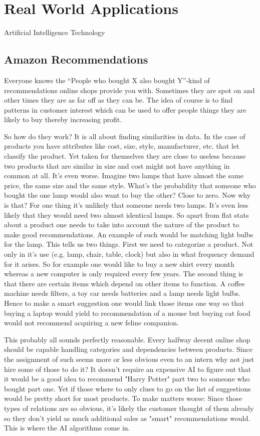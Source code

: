 \newpage
\section{Real World Applications}

Artificial Intelligence Technology 

\subsection{Amazon Recommendations}
Everyone knows the ``People who bought X also bought Y''-kind of recommendations online shops provide you with. Sometimes they are spot on and other times they are as far off as they can be. The idea of course is to find patterns in customer interest which can be used to offer people things they are likely to buy thereby increasing profit.

So how do they work? It is all about finding similarities in data. In the case of products you have attributes like cost, size, style, manufacturer, etc. that let classify the product. Yet taken for themselves they are close to useless because two products that are similar in size and cost might not have anything in common at all. It's even worse. Imagine two lamps that have almost the same price, the same size and the same style. What's the probability that someone who bought the one lamp would also want to buy the other? Close to zero. Now why is that? For one thing it's unlikely that someone needs two lamps. It's even less likely that they would need two almost identical lamps. So apart from flat stats about a product one needs to take into account the nature of the product to make good recommendations. An example of such would be matching light bulbs for the lamp. 
This tells us two things. First we need to categorize a product. Not only in it's use (e.g. lamp, chair, table, clock) but also in what frequency demand for it arises. So for example one would like to buy a new shirt every month whereas a new computer is only required every few years. The second thing is that there are certain items which depend on other items to function. A coffee machine needs filters, a toy car needs batteries and a lamp needs light bulbs. Hence to make a smart suggestion one would link those items one way so that buying a laptop would yield to recommendation of a mouse but buying cat food would not recommend acquiring a new feline companion.

This probably all sounds perfectly reasonable. Every halfway decent online shop should be capable handling categories and dependencies between products. Since the assignment of such seems more or less obvious even to an intern why not just hire some of those to do it? It doesn't require an expensive AI to figure out that it would be a good idea to recommend "Harry Potter" part two to someone who bought part one. Yet if those where to only clues to go on the list of suggestions would be pretty short for most products. To make matters worse: Since those types of relations are so obvious, it's likely the customer thought of them already so they don't yield as much additional sales as "smart" recommendations would. This is where the AI algorithms come in.

